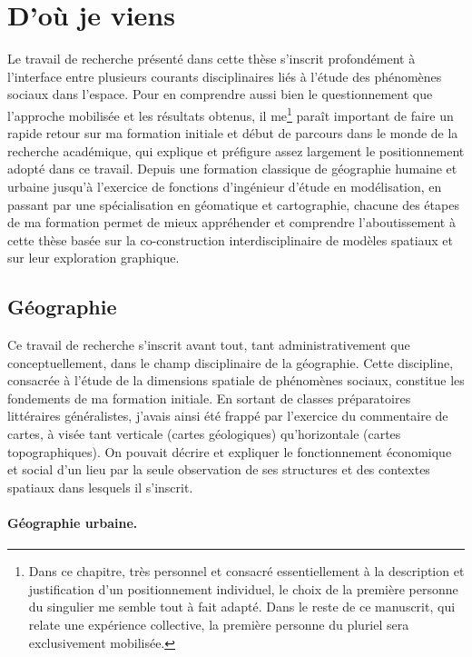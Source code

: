 \section{D'où je viens \label{sec:formation}}

Le travail de recherche présenté dans cette thèse s'inscrit profondément à l'interface entre plusieurs courants disciplinaires liés à l'étude des phénomènes sociaux dans l'espace.
Pour en comprendre aussi bien le questionnement que l'approche mobilisée et les résultats obtenus, il me\footnote{
	Dans ce chapitre, très personnel et consacré essentiellement à la description et justification d'un positionnement individuel, le choix de la première personne du singulier me semble tout à fait adapté.
	Dans le reste de ce manuscrit, qui relate une expérience collective, la première personne du pluriel sera exclusivement mobilisée.
} paraît important de faire un rapide retour sur ma formation initiale et début de parcours dans le monde de la recherche académique, qui explique et préfigure assez largement le positionnement adopté dans ce travail.
Depuis une formation classique de géographie humaine et urbaine jusqu'à l'exercice de fonctions d'ingénieur d'étude en modélisation, en passant par une spécialisation en géomatique et cartographie, chacune des étapes de ma formation permet de mieux appréhender et comprendre l'aboutissement à cette thèse basée sur la co-construction interdisciplinaire de modèles spatiaux et sur leur exploration graphique.

\subsection{Géographie}

Ce travail de recherche s'inscrit avant tout, tant administrativement que conceptuellement, dans le champ disciplinaire de la géographie.
Cette discipline, consacrée à l'étude de la dimensions spatiale de phénomènes sociaux, constitue les fondements de ma formation initiale.
En sortant de classes préparatoires littéraires généralistes, j'avais ainsi été frappé par l'exercice du commentaire de cartes, à visée tant verticale (cartes géologiques) qu'horizontale (cartes topographiques).
On pouvait décrire et expliquer le fonctionnement économique et social d'un lieu par la seule observation de ses structures et des contextes spatiaux dans lesquels il s'inscrit.

\paragraph{Géographie urbaine.}

